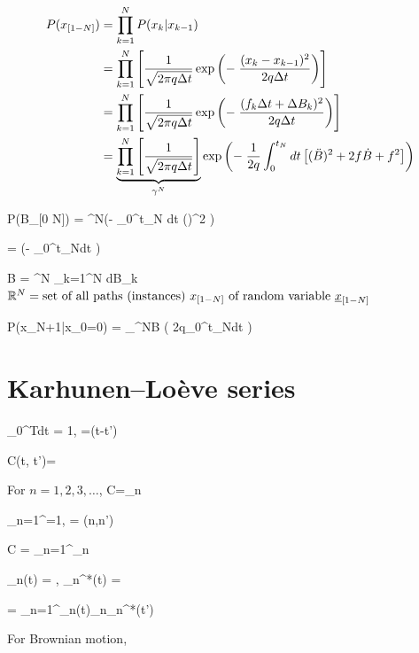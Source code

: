 \begin{align}
P(x_{[1- N]})&=
\prod_{k=1}^N P(x_k|x_{k-1})
\\
&=
\prod_{k=1}^N
\left[
\frac{1}{\sqrt{2\pi q\Delta t}}
\exp\left(
-\;
\frac{(x_k-x_{k-1})^2}{2q\Delta t}
\right)
\right]
\\
&=
\prod_{k=1}^N
\left[
\frac{1}{\sqrt{2\pi q \Delta t}}
\exp\left(
-\;
\frac{(f_k\Delta t + \Delta B_k)^2}{2q\Delta t}
\right)
\right]
\\
&=
\underbrace{\prod_{k=1}^N
\left[
\frac{1}{\sqrt{2\pi q \Delta t}}
\right]}_{\gamma^N}
\exp\left(
-\;
\frac{1}
{2q}\int_0^{t_N}dt
\left[(\ddot{B})^2 +
2f\dot{B} +f^2\right]
\right)
\end{align}



\beq
P(B_{[0 \upto N]})
=
\gamma^N\exp\left(-\;
\int_0^{t_N} dt ()^2
\right)
\eeq

\beq
{}=
\exp\left(-\;
\int_0^{t_N}dt
\right)
\label{eq-px-div-pb}
\eeq

\beq
\cald B = \gamma^N \prod_{k=1}^N dB_k
\eeq
${ \mathbb{R}}^N=
\text{set of all paths (instances) $x_{[1- N]}$ of random variable
${\underline{x}}_{[1- N]}$ }
$


\beq
P(x_{N+1}|x_0=0)  =
\int_{\RR^{N}}\cald B\;
\exp\left(
{2q}\int_0^{t_N}dt
\right)
\eeq

\section{Karhunen–Loève series}

\beq
\int_0^{T}dt\; = 1,
\;
=\delta(t-t')
\eeq

\beq
C(t, t')= 
\eeq


For $n=1,2,3,\ldots$, 
\beq
C=\lam_n
\eeq

\beq
\sum_{n=1}^\infty {}=1,
\;
=
\delta(n,n')
\eeq



\beq
C = \sum_{n=1}^\infty {}\lam_n
\eeq



\beq
\phi_n(t) = ,
\;
\phi_n^*(t) = 
\eeq

\beq
{} = \sum_{n=1}^\infty \phi_n(t)\lam_n\phi_n^*(t')
\eeq


For Brownian motion,

